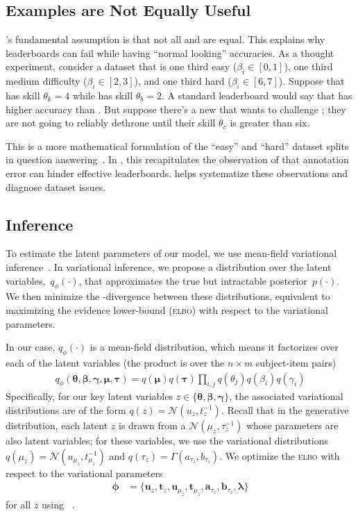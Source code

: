 \subsection{Examples are Not Equally Useful}

\irt{}'s fundamental assumption is that not all \itms{} and
\subjs{} are equal.
This explains why leaderboards can fail while having
``normal looking'' accuracies.
As a thought experiment, consider a dataset that is one third easy
($\beta_i \in [0,1]$), one third medium difficulty
($\beta_i \in [2,3]$), and one third hard ($\beta_i \in [6,7]$).
Suppose that \smart{} has skill $\theta_{k}=4$ while \dumb{} has skill
$\theta_{b}= 2$.
A standard leaderboard would say that \smart{} has higher accuracy
than \dumb{}.
But suppose there's a new \subj{} that wants to challenge \smart{};
they are not going to reliably dethrone \smart{} until their skill
$\theta_{c}$ is greater than six.

This is a more mathematical formulation of the ``easy'' and ``hard''
dataset splits in question
answering~\citep{sugawara-18,rondeau-18,sen2020learn}.
In , this recapitulates the observation of
\citet{Boyd-Graber-20} that annotation error can hinder effective
leaderboards.
\name{} helps systematize these observations and diagnose dataset issues.


\subsection{Inference}

To estimate the latent parameters of our model, we use mean-field
variational inference~\cite{jordan-99}.
In variational inference, we propose a distribution over the latent
variables,~$q_\phi(\cdot)$, that approximates the true but intractable
posterior~$p(\cdot)$.
We then minimize the -divergence between these distributions,
equivalent to maximizing the evidence lower-bound (\textsc{elbo}) with
respect to the variational parameters.

In our case, $q_\phi(\cdot)$ is a mean-field distribution, which means it
factorizes over each of the latent variables (the product is over the
$n \times m$ subject-item pairs)
\begin{align*}
  q_\phi(\bm{\theta}, \bm{\beta}, \bm{\gamma}, \bm{\mu}, \bm{\tau}) = q(\bm{\mu})q(\bm{\tau})\prod_{i,j} q(\theta_j)q(\beta_i)q(\gamma_i)
\end{align*}
Specifically, for our key latent variables $z \in \{\bm{\theta}, \bm{\beta}, \bm{\gamma}\}$, the associated variational distributions are of the form $q(z) = \mathcal{N}(u_z, t_z^{-1})$.
Recall that in the generative distribution, each latent $z$ is drawn from a $\mathcal{N}(\mu_z, \tau_z^{-1})$ whose parameters are also latent variables; for these variables, we use the variational distributions $q(\mu_z) = \mathcal{N}(u_{\mu_z}, t_{\mu_z}^{-1})$ and $q(\tau_z) = \Gamma(a_{\tau_z}, b_{\tau_z})$. We optimize the \textsc{elbo} with respect to the variational parameters
\begin{align*}
  \bm{\phi} & =\{\bm{u}_z,\bm{t}_z,\bm{u}_{\mu_z},\bm{t}_{\mu_z},\bm{a}_{\tau_z},\bm{b}_{\tau_z},\bm{\lambda}\}
\end{align*}
for all $z$ using ~\citep{Kingma2014AdamAM}.

